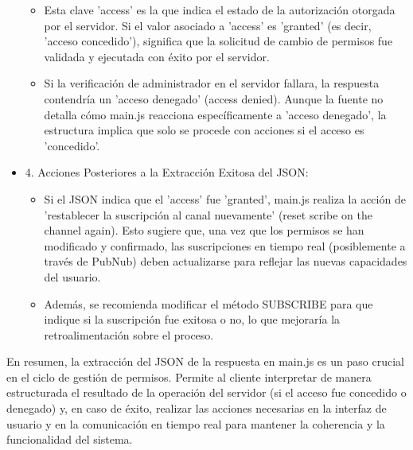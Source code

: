 \documentclass{report}
\begin{document}
\begin{itemize}
\begin{itemize}
            \item Esta clave 'access' es la que indica el estado de la autorización otorgada por el servidor. Si el valor asociado a 'access' es 
            'granted' (es decir, 'acceso concedido'), significa que la solicitud de cambio de permisos fue validada y ejecutada con éxito por el servidor.
            \item Si la verificación de administrador en el servidor fallara, la respuesta contendría un 'acceso denegado' (access denied). 
            Aunque la fuente no detalla cómo main.js reacciona específicamente a 'acceso denegado', la estructura implica que solo se procede 
            con acciones si el acceso es 'concedido'.
        \end{itemize}
    \item 4. Acciones Posteriores a la Extracción Exitosa del JSON:
        \begin{itemize}
            \item Si el JSON indica que el 'access' fue 'granted', main.js realiza la acción de 'restablecer la suscripción al canal nuevamente' 
            (reset scribe on the channel again). Esto sugiere que, una vez que los permisos se han modificado y confirmado, las suscripciones en 
            tiempo real (posiblemente a través de PubNub) deben actualizarse para reflejar las nuevas capacidades del usuario.
            \item Además, se recomienda modificar el método SUBSCRIBE para que indique si la suscripción fue exitosa o no, lo que mejoraría la 
            retroalimentación sobre el proceso.
        \end{itemize}
\end{itemize}
En resumen, la extracción del JSON de la respuesta en main.js es un paso crucial en el ciclo de gestión de permisos. Permite al 
cliente interpretar de manera estructurada el resultado de la operación del servidor (si el acceso fue concedido o denegado) y, 
en caso de éxito, realizar las acciones necesarias en la interfaz de usuario y en la comunicación en tiempo real para mantener la 
coherencia y la funcionalidad del sistema.
\end{document}
